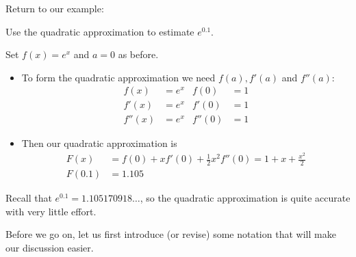 Return to our example:
\begin{eg}
 Use the quadratic approximation to estimate $e^{0.1}$.

\soln Set $f(x) = e^x$ and $a=0$ as before.
\begin{itemize}
 \item To form the quadratic approximation we need $f(a), f'(a)$ and $f''(a)$:
\begin{align*}
  f(x) &= e^x & f(0) & = 1 \\
  f'(x) &= e^x & f'(0) & = 1\\
  f''(x) &= e^x & f''(0) & = 1
\end{align*}
\item Then our quadratic approximation is
\begin{align*}
  F(x) &= f(0) + x f'(0)  + \frac{1}{2} x^2 f''(0) = 1 + x + \frac{x^2}{2} \\
  F(0.1) &= 1.105
\end{align*}
\end{itemize}
Recall that $e^{0.1} = 1.105170918\dots$, so the quadratic approximation is quite
accurate with very little effort.
\end{eg}



Before we go on, let us first introduce (or revise) some notation that will make our
discussion easier.





